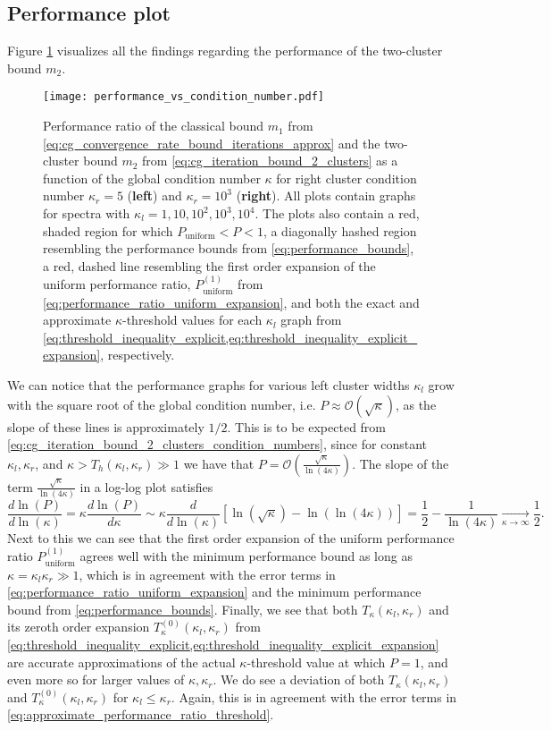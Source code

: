 \subsection{Performance plot}
Figure \ref{fig:two_cluster_bound_performance} visualizes all the findings regarding the performance of the two-cluster bound $m_2$.
\begin{figure}[H]
    \centering
    \texttt{[image: performance\_vs\_condition\_number.pdf]}
    \caption{Performance ratio of the classical bound $m_1$ from \cref{eq:cg_convergence_rate_bound_iterations_approx} and the two-cluster bound $m_2$ from \cref{eq:cg_iteration_bound_2_clusters} as a function of the global condition number $\kappa$ for right cluster condition number $\kappa_r = 5$ (\textbf{left}) and $\kappa_r = 10^3$ (\textbf{right}). All plots contain graphs for spectra with $\kappa_l = 1, 10, 10^2, 10^3, 10^4$. The plots also contain a red, shaded region for which $P_{\text{uniform}} < P < 1$, a diagonally hashed region resembling the performance bounds from \cref{eq:performance_bounds}, a red, dashed line resembling the first order expansion of the uniform performance ratio, $P^{(1)}_{\text{uniform}}$ from \cref{eq:performance_ratio_uniform_expansion}, and both the exact and approximate $\kappa$-threshold values for each $\kappa_l$ graph from \cref{eq:threshold_inequality_explicit,eq:threshold_inequality_explicit_expansion}, respectively.}
    \label{fig:two_cluster_bound_performance}
\end{figure}
We can notice that the performance graphs for various left cluster widths $\kappa_l$ grow with the square root of the global condition number, i.e. $P \approx \mathcal{O}(\sqrt{\kappa})$, as the slope of these lines is approximately $1/2$. This is to be expected from \cref{eq:cg_iteration_bound_2_clusters_condition_numbers}, since for constant $\kappa_l,\kappa_r$, and $\kappa > T_h(\kappa_l, \kappa_r) \gg 1$ we have that $P = \mathcal{O}\left(\frac{\sqrt{\kappa}}{\ln(4\kappa)}\right)$. The slope of the term $\frac{\sqrt{\kappa}}{\ln(4\kappa)}$ in a log-log plot satisfies
\[
    \frac{d\ln(P)}{d\ln(\kappa)} =\kappa\frac{d\ln(P)}{d\kappa} \sim \kappa\frac{d}{d\ln(\kappa)} \left[\ln(\sqrt{\kappa}) - \ln(\ln(4\kappa))\right] = \frac{1}{2} - \frac{1}{\ln(4\kappa)} \underset{\kappa\to\infty}{\longrightarrow} \frac{1}{2}.
\]
Next to this we can see that the first order expansion of the uniform performance ratio $P^{(1)}_{\text{uniform}}$ agrees well with the minimum performance bound as long as $\kappa = \kappa_l\kappa_r \gg 1$, which is in agreement with the error terms in \cref{eq:performance_ratio_uniform_expansion} and the minimum performance bound from \cref{eq:performance_bounds}. Finally, we see that both $T_{\kappa}(\kappa_l, \kappa_r)$ and its zeroth order expansion $T^{(0)}_{\kappa}(\kappa_l, \kappa_r)$ from \cref{eq:threshold_inequality_explicit,eq:threshold_inequality_explicit_expansion} are accurate approximations of the actual $\kappa$-threshold value at which $P=1$, and even more so for larger values of $\kappa,\kappa_r$. We do see a deviation of both $T_{\kappa}(\kappa_l, \kappa_r)$ and $T^{(0)}_{\kappa}(\kappa_l, \kappa_r)$ for $\kappa_l\leq\kappa_r$. Again, this is in agreement with the error terms in \cref{eq:approximate_performance_ratio_threshold}.

